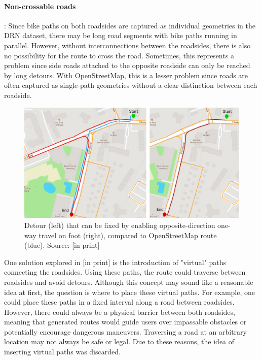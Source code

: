 \paragraph{Non-crossable roads}: Since bike paths on both roadsides are captured as individual geometries in the DRN dataset, there may be long road segments with bike paths running in parallel. However, without interconnections between the roadsides, there is also no possibility for the route to cross the road. Sometimes, this represents a problem since side roads attached to the opposite roadside can only be reached by long detours. With OpenStreetMap, this is a lesser problem since roads are often captured as single-path geometries without a clear distinction between each roadside. 


\begin{figure}[htbp]
\centering
\includegraphics[width=\linewidth]{images/oneway-travel-fix.png}
\caption{Detour (left) that can be fixed by enabling opposite-direction one-way travel on foot (right), compared to OpenStreetMap route (blue). Source: [in print]}
\label{fig:oneway-travel-fix}
\end{figure}

One solution explored in [in print] is the introduction of "virtual" paths connecting the roadsides. Using these paths, the route could traverse between roadsides and avoid detours. Although this concept may sound like a reasonable idea at first, the question is where to place these virtual paths. For example, one could place these paths in a fixed interval along a road between roadsides. However, there could always be a physical barrier between both roadsides, meaning that generated routes would guide users over impassable obstacles or potentially encourage dangerous maneuvers. Traversing a road at an arbitrary location may not always be safe or legal. Due to these reasons, the idea of inserting virtual paths was discarded.

